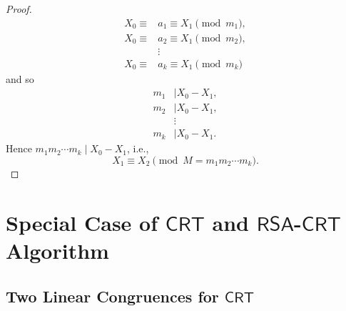 \documentclass{article}
\newcommand{\ie}{\textnormal{i.e.}}
\newcommand{\rsa}{\mathsf{RSA}}
\theoremstyle{definition}
\begin{document}
\begin{proof}
\begin{align*}
		X_0\equiv &a_1\equiv X_1\pmod{m_1},\\
		X_0\equiv &a_2\equiv X_1\pmod{m_2},\\
		&\vdots\\
		X_0\equiv &a_k\equiv X_1\pmod{m_k}
		\end{align*} and so \begin{align*}
		m_1&\mid X_0-X_1,\\
		m_2&\mid X_0-X_1,\\
		&\vdots\\
		m_k&\mid X_0-X_1.
		\end{align*} Hence $m_1m_2\cdots m_k\mid X_0-X_1$, \ie, \[
		X_1\equiv X_2\pmod{M=m_1m_2\cdots m_k}.
		\]
	\end{proof}
	\newpage
	
	\section{Special Case of $\mathsf{CRT}$ and $\rsa$-$\mathsf{CRT}$ Algorithm}
	
	\subsection{Two Linear Congruences for $\mathsf{CRT}$}
	
\end{document}
